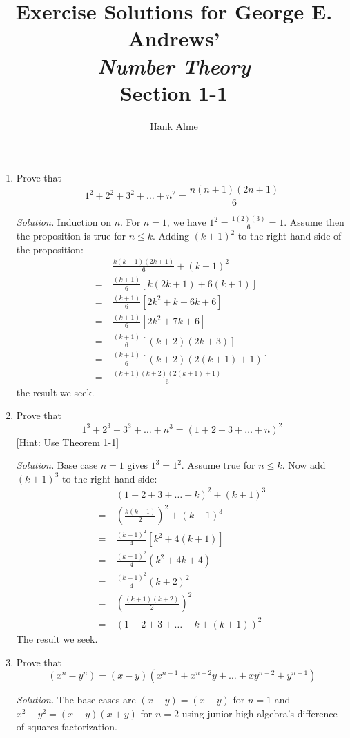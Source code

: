 \documentclass[12pt]{article}
\title{Exercise Solutions for George E. Andrews' \\
  {\em Number Theory} \\
Section 1-1}
\author{Hank Alme}
\newcommand\sol[1]{\begin{mdframed}
\emph{Solution.} #1
\end{mdframed}}
\begin{document}
\maketitle

\begin{enumerate}
\item Prove that
  \[
  1^2 + 2^2 + 3^2 + \ldots + n^2 = \frac{n(n+1)(2n+1)}{6}
  \]

  \sol{Induction on $n$. For $n =1$, we have $1^2 = \frac{1(2)(3)}{6} = 1$. Assume then the proposition is true for $n \le k$. Adding $(k+1)^2$ to the right hand side of the proposition:
\begin{align*}
   &\frac{k(k+1)(2k+1)}{6} + (k+1)^2 \\
  =\ &\frac{(k+1)}{6} [ k(2k+1) + 6(k+1) ] \\
  =\ &\frac{(k+1)}{6} [ 2k^2+k + 6k+6 ]\\
  =\ &\frac{(k+1)}{6} [ 2k^2+7k +6 ]\\
  =\ &\frac{(k+1)}{6} [ (k+2)(2k+3) ]\\
  =\ &\frac{(k+1)}{6} [ (k+2)(2(k+1)+1) ]\\
  =\ &\frac{(k+1)(k+2)(2(k+1)+1)}{6}  
\end{align*}
the result we seek.
}

\item Prove that
  \[
  1^3 + 2^3 + 3^3 + \ldots + n^3 = (1+2+3+\ldots+n)^2
  \]
    [Hint: Use Theorem 1-1]

    \sol{Base case $n=1$ gives $1^3 = 1^2$. Assume true for $n \le
      k$. Now add $(k+1)^3$ to the right hand side:
      \begin{align*}
         & (1+2+3+\ldots+k)^2 + (k+1)^3 \\
        =\ & \left (\frac{k(k+1)}{2} \right)^2 + (k+1)^3  \\
        =\ & \frac{(k+1)^2}{4} [k^2 + 4(k+1)] \\
        =\ & \frac{(k+1)^2}{4} (k^2 + 4k+4) \\
        =\ & \frac{(k+1)^2}{4} (k+2)^2 \\
        =\ & \left (\frac{(k+1)(k+2)}{2} \right)^2 \\
        =\ & (1+2+3+\ldots+k+(k+1))^2 
      \end{align*}
      The result we seek.}


  \item Prove that
    \[
    (x^n - y^n) = (x-y)(x^{n-1} + x^{n-2}y + \ldots +xy^{n-2}+y^{n-1})
    \]

    \sol{
      The base cases are $(x-y) = (x-y)$ for $n=1$ and $x^2 - y^2 = (x-y)(x+y)$ for $n=2$ using junior high algebra's difference of squares factorization.
      
}
\end{enumerate}
\end{document}
